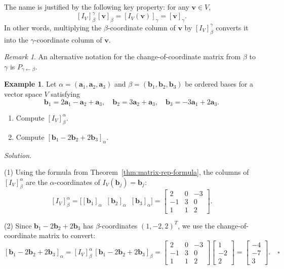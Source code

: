 \documentclass[11pt, a4paper, notitlepage]{report}
\theoremstyle{definition}
\newtheorem{example}[theorem]{Example}
\theoremstyle{remark}
\newtheorem{remark}[theorem]{Remark}
\begin{document}
The name is justified by the following key property: for any $\mathbf{v} \in V$,
\[
  [I_V]_\beta^\gamma\,[\mathbf{v}]_\beta = [I_V(\mathbf{v})]_\gamma = [\mathbf{v}]_\gamma.
\]
In other words, multiplying the $\beta$-coordinate column of $\mathbf{v}$ by
$[I_V]_\beta^\gamma$ converts it into the $\gamma$-coordinate column of $\mathbf{v}$.

\begin{remark}
\label{rem:change-coord-notation}
An alternative notation for the change-of-coordinate matrix from $\beta$ to $\gamma$ is
$P_{\gamma \leftarrow \beta}$.
\end{remark}

\begin{example}
\label{ex:change-of-coord-3d}
Let $\alpha = (\mathbf{a}_1, \mathbf{a}_2, \mathbf{a}_3)$ and
$\beta = (\mathbf{b}_1, \mathbf{b}_2, \mathbf{b}_3)$ be ordered bases for a vector space
$V$ satisfying
\[
  \mathbf{b}_1 = 2\mathbf{a}_1 - \mathbf{a}_2 + \mathbf{a}_3,\quad
  \mathbf{b}_2 = 3\mathbf{a}_2 + \mathbf{a}_3,\quad
  \mathbf{b}_3 = -3\mathbf{a}_1 + 2\mathbf{a}_3.
\]
\begin{enumerate}
  \item Compute $[I_V]_\beta^\alpha$.
  \item Compute $[\mathbf{b}_1 - 2\mathbf{b}_2 + 2\mathbf{b}_3]_\alpha$.
\end{enumerate}

\emph{Solution.}

(1) Using the formula from Theorem~\ref{thm:matrix-rep-formula}, the columns of
$[I_V]_\beta^\alpha$ are the $\alpha$-coordinates of $I_V(\mathbf{b}_j) = \mathbf{b}_j$:
\[
  [I_V]_\beta^\alpha
  = \bigl[[\mathbf{b}_1]_\alpha \;\; [\mathbf{b}_2]_\alpha \;\; [\mathbf{b}_3]_\alpha\bigr]
  = \begin{bmatrix} 2 & 0 & -3 \\ -1 & 3 & 0 \\ 1 & 1 & 2 \end{bmatrix}.
\]

(2) Since $\mathbf{b}_1 - 2\mathbf{b}_2 + 2\mathbf{b}_3$ has $\beta$-coordinates
$(1,-2,2)^T$, we use the change-of-coordinate matrix to convert:
\[
  [\mathbf{b}_1 - 2\mathbf{b}_2 + 2\mathbf{b}_3]_\alpha
  = [I_V]_\beta^\alpha\,[\mathbf{b}_1 - 2\mathbf{b}_2 + 2\mathbf{b}_3]_\beta
  = \begin{bmatrix} 2 & 0 & -3 \\ -1 & 3 & 0 \\ 1 & 1 & 2 \end{bmatrix}
    \begin{bmatrix} 1 \\ -2 \\ 2 \end{bmatrix}
  = \begin{bmatrix} -4 \\ -7 \\ 3 \end{bmatrix}. \quad\square
\]
\end{example}
\end{document}
